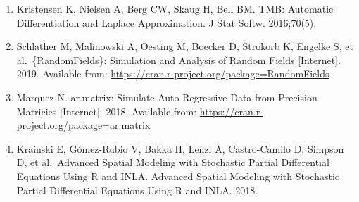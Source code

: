 \documentclass[
]{article}
\begin{document}
\begin{enumerate}
\item
  Kristensen K, Nielsen A, Berg CW, Skaug H, Bell BM. TMB: Automatic Differentiation and Laplace Approximation. J Stat Softw. 2016;70(5).
\item
  Schlather M, Malinowski A, Oesting M, Boecker D, Strokorb K, Engelke S, et al.~\{RandomFields\}: Simulation and Analysis of Random Fields {[}Internet{]}. 2019. Available from: \url{https://cran.r-project.org/package=RandomFields}
\item
  Marquez N. ar.matrix: Simulate Auto Regressive Data from Precision Matricies {[}Internet{]}. 2018. Available from: \url{https://cran.r-project.org/package=ar.matrix}
\item
  Krainski E, Gómez-Rubio V, Bakka H, Lenzi A, Castro-Camilo D, Simpson D, et al.~Advanced Spatial Modeling with Stochastic Partial Differential Equations Using R and INLA. Advanced Spatial Modeling with Stochastic Partial Differential Equations Using R and INLA. 2018.
\end{enumerate}
\end{document}

